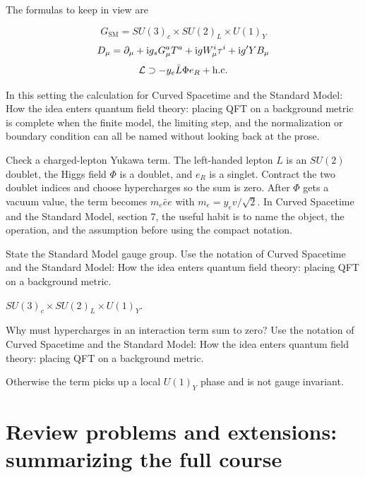 The formulas to keep in view are

\[
  G_{\mathrm{SM}}=SU(3)_c\times SU(2)_L\times U(1)_Y
\]
\[
  D_\mu=\partial_\mu+\mathrm i g_sG_\mu^aT^a+\mathrm i gW_\mu^i\tau^i+\mathrm i g'YB_\mu
\]
\[
  \mathcal L\supset -y_e\bar L\Phi e_R+\hbox{h.c.}
\]

In this setting the calculation for Curved Spacetime and the Standard Model: How the idea enters quantum field theory: placing QFT on a background metric is complete when the finite model, the limiting step, and the normalization or boundary condition can all be named without looking back at the prose.




\begin{example}
Check a charged-lepton Yukawa term.  The left-handed lepton \(L\) is an \(SU(2)\) doublet, the Higgs field \(\Phi\) is a doublet, and \(e_R\) is a singlet.  Contract the two doublet indices and choose hypercharges so the sum is zero.  After \(\Phi\) gets a vacuum value, the term becomes \(m_e\bar e e\) with \(m_e=y_ev/\sqrt2\).  In Curved Spacetime and the Standard Model, section 7, the useful habit is to name the object, the operation, and the assumption before using the compact notation.
\end{example}



\begin{exercise}
State the Standard Model gauge group.  Use the notation of Curved Spacetime and the Standard Model: How the idea enters quantum field theory: placing QFT on a background metric.
\begin{answer}
\(SU(3)_c\times SU(2)_L\times U(1)_Y\).
\end{answer}
\end{exercise}

\begin{exercise}
Why must hypercharges in an interaction term sum to zero?  Use the notation of Curved Spacetime and the Standard Model: How the idea enters quantum field theory: placing QFT on a background metric.
\begin{answer}
Otherwise the term picks up a local \(U(1)_Y\) phase and is not gauge invariant.
\end{answer}
\end{exercise}



\section{Review problems and extensions: summarizing the full course}

